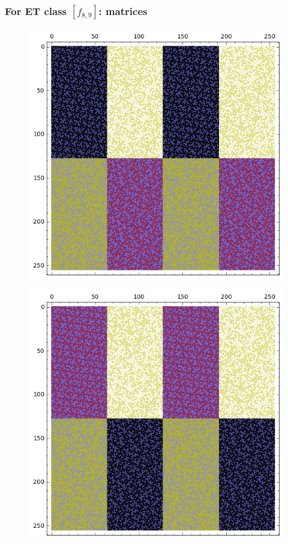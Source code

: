 \documentclass[pdf,sprung,slideColor,nocolorBG]{beamer}
\newenvironment{colortheme}[1]{
\def\ProvidesPackageRCS $##1${\relax}
\renewcommand{\ProcessOptions}{\relax}
\makeatletter

\makeatother
}{}
\begin{document}
\begin{colortheme}{jubata}
\begin{frame}
\begin{figure}
\begin{minipage}{.48\textwidth}
  \label{fig:8_8_bent_cayley_graph_index_matrix}
\end{minipage}
\end{figure}
~
\end{frame}
\begin{frame}
\frametitle{For ET class $[f_{8,9}]$: matrices}
\begin{figure}
\centering
\begin{minipage}{.48\textwidth}
  \centering
  \includegraphics[width=.9\linewidth]{../matrix_plot/c8_9_bent_cayley_graph_index_matrix.png}
  \label{fig:c8_9_bent_cayley_graph_index_matrix}
\end{minipage}
\begin{minipage}{.48\textwidth}
  \centering
  \includegraphics[width=.9\linewidth]{../matrix_plot/c8_9_dual_cayley_graph_index_matrix.png}

\end{minipage}
\end{figure}
\end{frame}
\end{colortheme}
\end{document}
